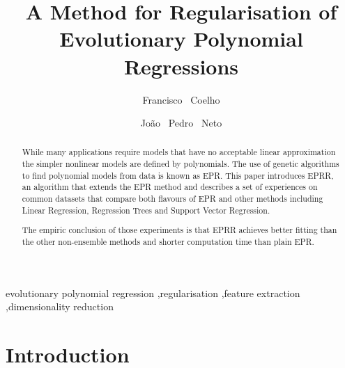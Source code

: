 \documentclass[preprint,authoryear,12pt]{elsarticle}
\begin{document}
\begin{frontmatter}

\title{A Method for Regularisation of Evolutionary Polynomial Regressions}

\author[ue,labmag]{Francisco ~Coelho}

\author[fcul,labmag]{João ~Pedro ~Neto}


\address[ue]{Dept. Informática, Universidade de Évora, Rua Romão Ramalho 58, 7000-671 Évora}
\address[fcul]{Dept. Informática, Faculdade de Ciências da Universidade de Lisboa, Campo Grande 1749-016 Lisboa}
\address[labmag]{Laboratory of Agent Modelling (LabMAg)}
%
%
\begin{abstract}
While many applications require models that have no acceptable linear approximation the simpler nonlinear models are defined by polynomials. The use of genetic algorithms to find polynomial models from data is known as \ac{EPR}.
%
This paper introduces \ac{EPRR}, an algorithm that extends the \ac{EPR} method and describes a set of experiences on common datasets that compare both flavours of \ac{EPR} and other methods including Linear Regression, Regression Trees and Support Vector Regression.

The empiric conclusion of those experiments is that \ac{EPRR} achieves better fitting than the other non-ensemble methods and shorter computation time than plain \ac{EPR}.
\end{abstract}
%
\begin{keyword}
evolutionary polynomial regression \sep regularisation \sep feature extraction \sep dimensionality reduction 
\end{keyword}
\end{frontmatter}
%
%
%
%
\section{Introduction}
\end{document}
